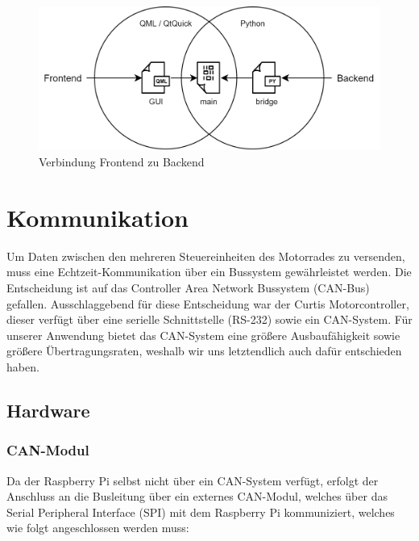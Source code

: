 \begin{figure}[H]
	\begin{center}
		\includegraphics[scale=0.33]{figures/hcis/bridge.png}
		\caption{Verbindung Frontend zu Backend}
	\end{center}
\end{figure}

\newpage


\section{Kommunikation}

Um Daten zwischen den mehreren Steuereinheiten des Motorrades zu versenden, muss eine Echtzeit-Kommunikation über ein Bussystem gewährleistet werden. Die Entscheidung ist auf das Controller Area Network Bussystem (CAN-Bus) gefallen. Ausschlaggebend für diese Entscheidung war der Curtis Motorcontroller, dieser verfügt über eine serielle Schnittstelle (RS-232) sowie ein CAN-System. Für unserer Anwendung bietet das CAN-System eine größere Ausbaufähigkeit sowie größere Übertragungsraten, weshalb wir uns letztendlich auch dafür entschieden haben.

\subsection{Hardware}

\subsubsection{CAN-Modul}

Da der Raspberry Pi selbst nicht über ein CAN-System verfügt, erfolgt der Anschluss an die Busleitung über ein externes CAN-Modul, welches über das Serial Peripheral Interface (SPI) mit dem Raspberry Pi kommuniziert, welches wie folgt angeschlossen werden muss: 

